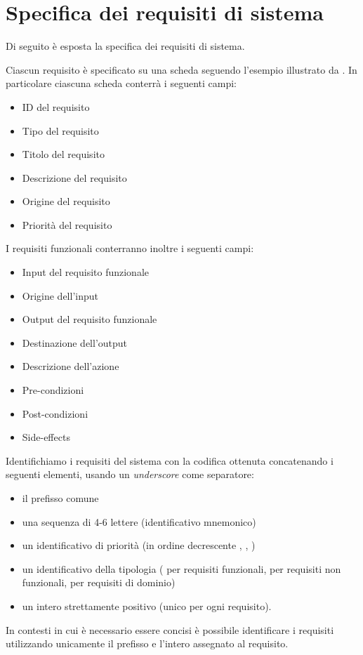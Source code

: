 
\section{Specifica dei requisiti di sistema}

Di seguito \`e esposta la specifica dei requisiti di sistema.

Ciascun requisito \`e specificato su una scheda seguendo l'esempio illustrato da \cite[p. 97]{sommerville}.
In particolare ciascuna scheda conterr\`a i seguenti campi:
\begin{itemize}
	\item ID del requisito
	\item Tipo del requisito
	\item Titolo del requisito
	\item Descrizione del requisito
	\item Origine del requisito
	\item Priorit\`a del requisito
\end{itemize}
I requisiti funzionali conterranno inoltre i seguenti campi:
\begin{itemize}
	\item Input del requisito funzionale
	\item Origine dell'input
	\item Output del requisito funzionale
	\item Destinazione dell'output
	\item Descrizione dell'azione
	\item Pre-condizioni
	\item Post-condizioni
	\item Side-effects
\end{itemize}

Identifichiamo i requisiti del sistema con la codifica ottenuta concatenando i seguenti elementi, usando un \emph{underscore} come separatore:
\begin{itemize}
	\item il prefisso comune 
	\item una sequenza di 4-6 lettere (identificativo mnemonico)
	\item un identificativo di priorit\`a (in ordine decrescente , , )
	\item un identificativo della tipologia ( per requisiti funzionali,  per requisiti non funzionali,  per requisiti di dominio)
	\item un intero strettamente positivo (unico per ogni requisito).
\end{itemize}
In contesti in cui \`e necessario essere concisi \`e possibile identificare i requisiti utilizzando unicamente il prefisso  e l'intero assegnato al requisito.



